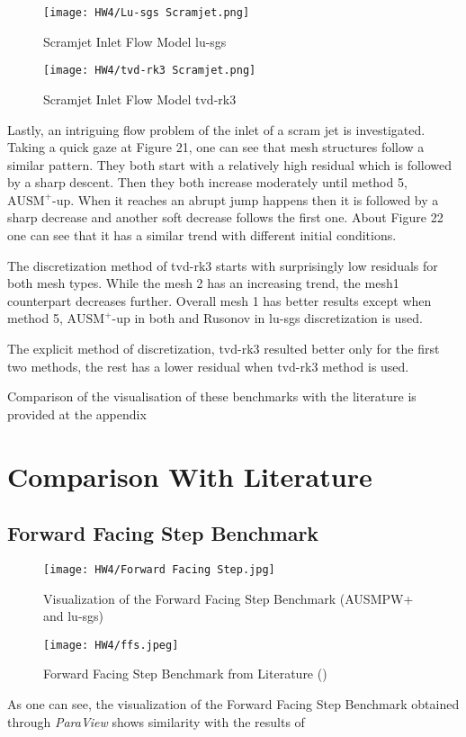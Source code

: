\documentclass[a4paper, 12pt]{article}
\begin{document}
\begin{figure}[H]
    \centering
    \texttt{[image: HW4/Lu-sgs Scramjet.png]}
    \caption{Scramjet Inlet Flow Model lu-sgs}
\end{figure}
\begin{figure}[H]
    \centering
    \texttt{[image: HW4/tvd-rk3 Scramjet.png]}
    \caption{Scramjet Inlet Flow Model tvd-rk3}
\end{figure}
Lastly, an intriguing flow problem of the inlet of a scram jet is investigated. Taking a quick gaze at Figure 21, one can see that mesh structures follow a similar pattern. They both start with a relatively high residual which is followed by a sharp descent. Then they both increase moderately until method 5, $\text{AUSM}^+\text{-up}$. When it reaches an abrupt jump happens then it is followed by a sharp decrease and another soft decrease follows the first one. About Figure 22 one can see that it has a similar trend with different initial conditions.\\\par
The discretization method of tvd-rk3 starts with surprisingly low residuals for both mesh types. While the mesh 2 has an increasing trend, the mesh1 counterpart decreases further. Overall mesh 1 has better results except when method 5, $\text{AUSM}^+\text{-up}$ in both and Rusonov in lu-sgs discretization is used.\\\par
The explicit method of discretization, tvd-rk3 resulted better only for the first two methods, the rest has a lower residual when tvd-rk3 method is used. \\\par

Comparison of the visualisation of these benchmarks with the literature is provided at the appendix

\appendix
\section{Comparison With Literature}
\subsection{Forward Facing Step Benchmark}
\begin{figure}[H]
    \centering
    \texttt{[image: HW4/Forward Facing Step.jpg]}
    \caption{Visualization of the Forward Facing Step Benchmark (AUSMPW+ and lu-sgs)}
\end{figure}
\begin{figure}[H]
    \centering
    \texttt{[image: HW4/ffs.jpeg]}
    \caption{Forward Facing Step Benchmark from Literature (\cite{ffs})}
\end{figure} \par
As one can see, the visualization of the Forward Facing Step Benchmark obtained through \textit{ParaView} shows similarity with the results of \cite{ffs}
\newpage
\end{document}
